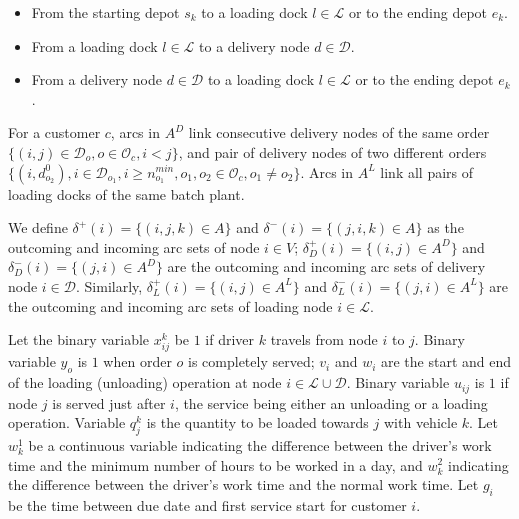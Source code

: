 \documentclass{article}
\begin{document}
\begin{itemize}
    \item From the starting depot $s_k$ to a loading dock $l \in \mathcal{L}$ or to the ending depot $e_k$.
    \item From a loading dock $l \in \mathcal{L}$ to a delivery node $d \in \mathcal{D}$.
    \item From a delivery node  $d \in \mathcal{D}$ to a loading dock $l \in \mathcal{L}$ or to the ending depot $e_k$.
\end{itemize}

For a customer $c$, arcs in $A^D$ link consecutive delivery nodes of the same order   $\lbrace (i,j)\in \mathcal{D}_o, o \in \mathcal{O}_c, i < j  \rbrace$, and pair of delivery nodes of two different orders $ \lbrace (i,d^{0}_{o_2}),  i \in \mathcal{D}_{o_1}, i \geq n^{min}_{o_1}, o_1, o_2 \in \mathcal{O}_c, o_1 \neq o_2 \rbrace $. Arcs in $A^L$ link all pairs of loading docks of the same batch plant.

We define $\delta^{+}(i) = \{(i, j,k) \in A \}$ and $\delta^{-}(i) = \{(j, i,k) \in A \}$ as the outcoming and incoming arc sets of node $i \in V$; $\delta^{+}_D(i) = \{(i, j)  \in A^D\}$ and $\delta^{-}_D(i) = \{(j, i) \in A^D \}$ are the outcoming and incoming arc sets of delivery node $i \in \mathcal{D}$.  Similarly, $\delta^{+}_L(i) = \{(i, j)  \in A^L\}$ and $\delta^{-}_L(i) = \{(j, i) \in A^L \}$ are the outcoming and incoming arc sets of loading node $i \in \mathcal{L}$.

Let the binary variable $x^{k}_{ij}$ be $1$ if driver $k$ travels from node $i$ to $j$. Binary variable $y_o$ is $1$ when order $o$ is completely served; $v_i$ and $w_i$ are the start and end of the loading (unloading) operation at node $i \in \mathcal{L}\cup \mathcal{D}$. Binary variable $u_{ij}$ is $1$ if node $j$ is served just after $i$, the service being either an unloading or a loading operation. %
Variable $q^k_j$ is the quantity to be loaded towards $j$ with vehicle $k$. Let $w^1_k$ be a continuous variable indicating the difference between the driver's work time and the minimum number of hours to be worked in a day, and $w^2_k$ indicating the difference between the driver's work time and the normal work time. Let $g_i$ be the time between due date and first service start for customer $i$.
\end{document}
